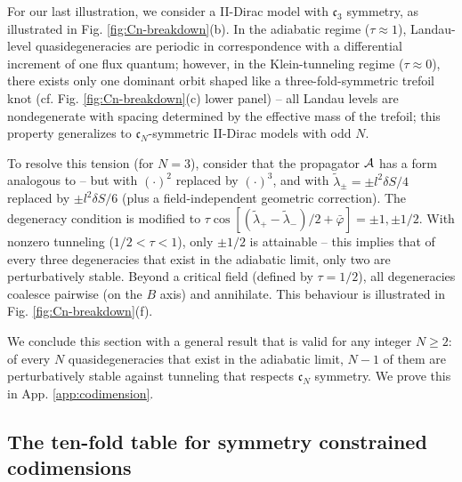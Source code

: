 \documentclass[aps, showpacs, twocolumn, notitlepage, superscriptaddress]{revtex4-1}
\begin{document}
For our last illustration, we consider a II-Dirac model with $\mathfrak{c}_3$  symmetry, as illustrated in Fig. \ref{fig:Cn-breakdown}(b). In the adiabatic regime ($\tau{\approx}1$), Landau-level quasidegeneracies are periodic in correspondence with a differential increment of one flux quantum; however, in the Klein-tunneling regime ($\tau{\approx}0$), there exists only one dominant orbit shaped like a three-fold-symmetric trefoil knot (cf. Fig. \ref{fig:Cn-breakdown}(c) lower panel) --  all Landau levels are nondegenerate with spacing determined by the effective mass of the trefoil; this property generalizes to $\mathfrak{c}_N$-symmetric II-Dirac models with odd $N$.   

To resolve this tension (for $N{=}3$), consider that the propagator ${\cal A}$ has a form analogous to  -- but with $(\cdot)^2$ replaced by $(\cdot)^3$, and with $\tilde{\lambda}_\pm{=}{\pm} l^2\delta S/4$ replaced by $\pm l^2\delta S/6$ (plus a field-independent geometric correction). The degeneracy condition is modified to $\tau\cos[(\tilde{\lambda}_+{-}\tilde{\lambda}_-)/2{+}\bar{\varphi}]{=}{\pm} 1,{\pm} 1/2$. With nonzero tunneling ($1/2{<}\tau {<}1$), only $\pm 1/2$ is attainable -- this implies that of every three degeneracies that exist in the adiabatic limit, only two are perturbatively stable. Beyond a critical field  (defined by $\tau{=}1/2$), all degeneracies coalesce pairwise (on the $B$ axis) and annihilate. This behaviour is illustrated in Fig. \ref{fig:Cn-breakdown}(f).

We conclude this section with a general result that is valid for any integer $N{\geq}2$: of every $N$ quasidegeneracies that exist in the adiabatic limit, $N{-}1$ of them are perturbatively stable against tunneling that respects  $\mathfrak{c}_N$ symmetry. We prove this in App. \ref{app:codimension}.


\subsection{The ten-fold table for symmetry constrained codimensions}\label{sec:tenfold}
\end{document}
